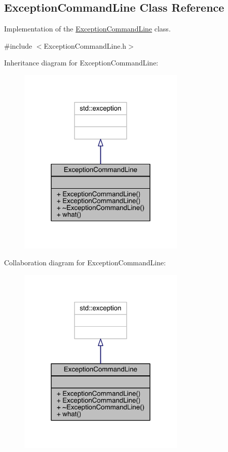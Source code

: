 \hypertarget{a00026}{}\subsection{Exception\+Command\+Line Class Reference}
\label{a00026}


Implementation of the \hyperlink{a00026}{Exception\+Command\+Line} class.  




{\ttfamily \#include $<$Exception\+Command\+Line.\+h$>$}



Inheritance diagram for Exception\+Command\+Line\+:\nopagebreak
\begin{figure}[H]
\begin{center}
\leavevmode
\includegraphics[width=226pt]{a00162}
\end{center}
\end{figure}


Collaboration diagram for Exception\+Command\+Line\+:\nopagebreak
\begin{figure}[H]
\begin{center}
\leavevmode
\includegraphics[width=226pt]{a00163}
\end{center}
\end{figure}
